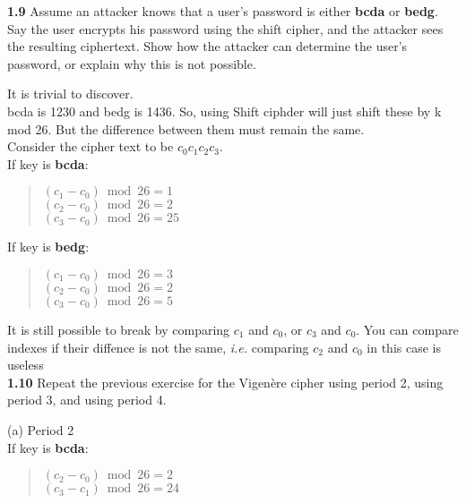 \vspace{1em}
\noindent
\textbf{1.9} \hspace{1em}Assume an attacker knows that a user’s password is either \textbf{bcda} or \textbf{bedg}. Say the user encrypts his password using the shift cipher, and the attacker sees the resulting ciphertext. Show how the attacker can determine the user’s password, or explain why this is not possible.
\vspace{1em}

It is trivial to discover.\\

bcda is 1230 and bedg is 1436. So, using Shift ciphder will just shift these by k mod 26. But the difference between them must remain the same.\\

Consider the cipher text to be \(c_0c_1c_2c_3\).\\

If key is \textbf{bcda}:
\begin{quote}
	\((c_1 - c_0) \bmod 26 = 1\) \\
	\((c_2 - c_0) \bmod 26 = 2\) \\
	\((c_3 - c_0) \bmod 26 = 25\)
\end{quote}

If key is \textbf{bedg}:
\begin{quote}
	\((c_1 - c_0) \bmod 26 = 3\) \\
	\((c_2 - c_0) \bmod 26 = 2\) \\
	\((c_3 - c_0) \bmod 26 = 5\)
\end{quote}

It is still possible to break by comparing \(c_1\) and \(c_0\), or  \(c_3\) and \(c_0\). You can compare indexes if their diffence is not the same, \textit{i.e.} comparing  \(c_2\) and \(c_0\) in this case is useless\\

\vspace{1em}
\noindent
\textbf{1.10} \hspace{1em}Repeat the previous exercise for the Vigenère cipher using period 2, using period 3, and using period 4.
\vspace{1em}

(a) Period 2\\

If key is \textbf{bcda}:
\begin{quote}
	\((c_2 - c_0) \bmod 26 = 2\)\\
	\((c_3 - c_1) \bmod 26 = 24\)
\end{quote}

